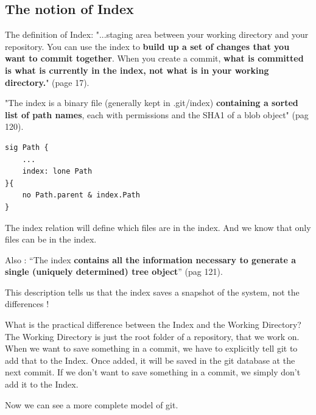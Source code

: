 \subsection{The notion of Index}

The definition of Index:
"...staging area between your working directory and your
repository. You can use the index to {\bf build up a set of 
changes that you want to commit together}. When you create
a commit, {\bf what is committed is what is currently in the
index, not what is in your working directory.}"
\cite{gitComm} (page 17). \par

"The index is a binary file (generally kept in .git/index) 
{\bf containing a sorted list of path names}, each with permissions and the
SHA1 of a blob object" \cite{gitComm} (pag 120). \par 

\begin{lstlisting}
sig Path {
	...
	index: lone Path
}{
	no Path.parent & index.Path
}
\end{lstlisting}

The index relation will define which files are in the index. And we know that only
files can be in the index. \par

Also : ``The index {\bf contains all the information necessary to generate a single
(uniquely determined) tree object}'' \cite{gitComm} (pag 121). \par
This description tells us that the index saves a snapshot of the system,
not the differences !

What is the practical difference between the Index and the Working
Directory? The Working Directory is just the root folder of a repository,
that we work on. When we want to save something in a commit, we have to explicitly 
tell git to add that to the Index. Once added, it
will be saved in the git database at the next commit. If we don't want to save
something in a commit, we simply don't add it to the Index.

Now we can see a more complete model of git.

